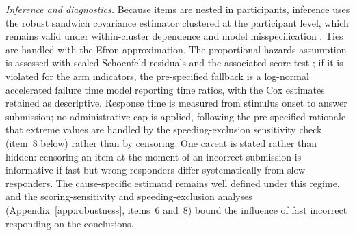 \emph{Inference and diagnostics.} Because items are nested in participants, inference uses the robust sandwich covariance estimator clustered at the participant level, which remains valid under within-cluster dependence and model misspecification \parencite{lin1989}. %
Ties are handled with the Efron approximation. The proportional-hazards assumption is assessed with scaled Schoenfeld residuals and the associated score test \parencite{grambsch1994}; %
if it is violated for the arm indicators, the pre-specified fallback is a log-normal accelerated failure time model reporting time ratios, with the Cox estimates retained as descriptive. Response time is measured from stimulus onset to answer submission; no administrative cap is applied, following the pre-specified rationale that extreme values are handled by the speeding-exclusion sensitivity check (item~8 below) rather than by censoring. One caveat is stated rather than hidden: censoring an item at the moment of an incorrect submission is informative if fast-but-wrong responders differ systematically from slow responders. The cause-specific estimand remains well defined under this regime, and the scoring-sensitivity and speeding-exclusion analyses (Appendix~\ref{app:robustness}, items~6 and~8) bound the influence of fast incorrect responding on the conclusions.

